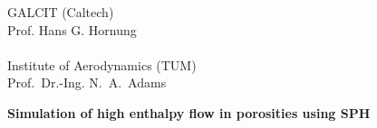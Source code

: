 


% 

\pagestyle{empty}

\begin{center}

\vspace*{-2.8cm}
\begin{minipage}[c]{.30\textwidth}
\end{minipage}
\begin{minipage}[c]{.43\textwidth}
\vspace*{1em}
    {GALCIT (Caltech)\\Prof. Hans G. Hornung \\ \\ Institute of Aerodynamics (TUM) \\ Prof.~Dr.-Ing. N.~A.~Adams}%
\end{minipage}
\begin{minipage}[c]{.25\textwidth}
\end{minipage}

\vspace*{4.3cm}
\begin{minipage}[c]{11cm}
{\LARGE\bf 
Simulation of high enthalpy flow in porosities using SPH}
\end{minipage}




\vspace*{1.0cm}


\end{center}
